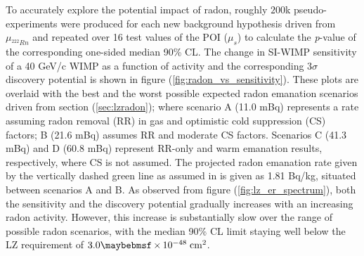 {To accurately explore the potential impact of radon, roughly $200$k pseudo-experiments were produced for each new background hypothesis driven from $\mu_{^{222}Rn}$ and repeated over 16 test values of the POI ($\mu_{s}$) to calculate the \textit{p}-value of the corresponding one-sided median 90\% CL. The change in SI-WIMP sensitivity of a 40 GeV/c\squared{} WIMP as a function of \RnTTT{} activity and the corresponding $3\sigma$ discovery potential is shown in figure (\ref{fig:radon_vs_sensitivity}). These plots are overlaid with the best and the worst possible expected radon emanation scenarios driven from section (\ref{sec:lzradon}); where scenario A (11.0 mBq) represents a rate assuming radon removal (RR) in gas and optimistic cold suppression (CS) factors; B (21.6 mBq) assumes RR and moderate CS factors. Scenarios C (41.3 mBq) and D (60.8 mBq) represent RR-only and warm emanation results, respectively, where CS is not assumed. The projected radon emanation rate given by the vertically dashed green line as assumed in \cite{akerib2018projected} is given as 1.81 \micro{}Bq/kg, situated between scenarios A and B. As observed from figure (\ref{fig:lz_er_spectrum}), both the sensitivity and the discovery potential gradually increases with an increasing radon activity. However, this increase is substantially slow over the range of possible radon scenarios, with the median 90\% CL limit staying well below the LZ requirement of $3.0 \times 10^{-48} \; \MathText{cm}^2$. 

}
